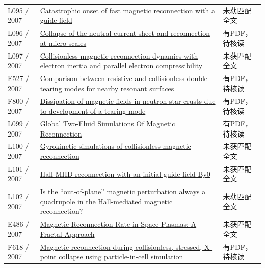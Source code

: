 \begin{longtable}{P{24mm}P{97mm}P{27mm}}
L095 / 2007 & \href{https://doi.org/10.1063/1.2734948}{Catastrophic onset of fast magnetic reconnection with a guide field} & 未获匹配全文\\

L096 / 2007 & \href{https://doi.org/10.1017/s0022377807006757}{Collapse of the neutral current sheet and reconnection at micro-scales} & 有PDF，待核读\\

L097 / 2007 & \href{https://doi.org/10.1017/s0022377806006313}{Collisionless magnetic reconnection dynamics with electron inertia and parallel electron compressibility} & 未获匹配全文\\

E527 / 2007 & \href{https://doi.org/10.1088/0741-3335/49/5/008}{Comparison between resistive and collisionless double tearing modes for nearby resonant surfaces} & 有PDF，待核读\\

F800 / 2007 & \href{https://doi.org/10.48550/arxiv.0705.3186}{Dissipation of magnetic fields in neutron star crusts due to development of a tearing mode} & 有PDF，待核读\\

L099 / 2007 & \href{https://doi.org/10.5281/zenodo.47873}{Global Two-Fluid Simulations Of Magnetic Reconnection} & 有PDF，待核读\\

L100 / 2007 & \href{https://doi.org/10.1063/1.2774003}{Gyrokinetic simulations of collisionless magnetic reconnection} & 未获匹配全文\\

L101 / 2007 & \href{https://doi.org/10.1016/j.asr.2007.09.035}{Hall MHD reconnection with an initial guide field By0} & 未获匹配全文\\

L102 / 2007 & \href{https://doi.org/10.1063/1.2820904}{Is the “out-of-plane” magnetic perturbation always a quadrupole in the Hall-mediated magnetic reconnection?} & 未获匹配全文\\

E486 / 2007 & \href{https://doi.org/10.1103/physrevlett.99.175002}{Magnetic Reconnection Rate in Space Plasmas: A Fractal Approach} & 未获匹配全文\\

F618 / 2007 & \href{https://doi.org/10.1063/1.2800854}{Magnetic reconnection during collisionless,  stressed,  X-point collapse using particle-in-cell simulation} & 有PDF，待核读\\


\end{longtable}
